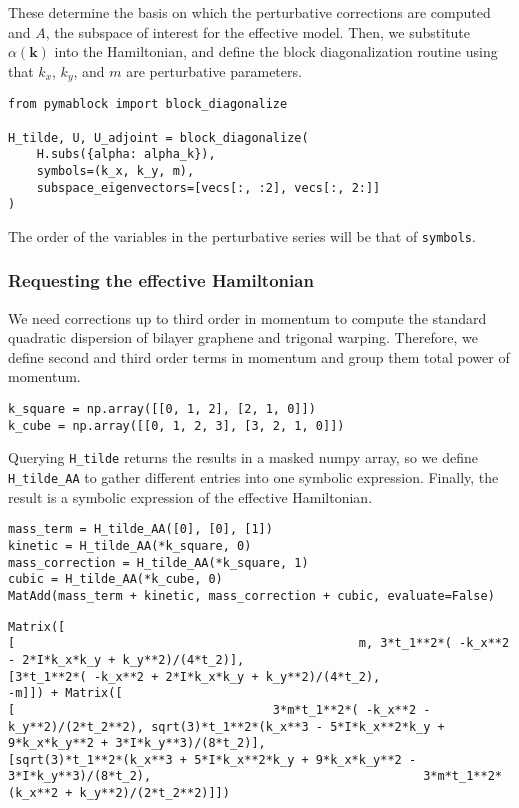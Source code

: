 These determine the basis on which the perturbative corrections are computed
and $A$, the subspace of interest for the effective model.
Then, we substitute $\alpha(\mathbf{k})$ into the Hamiltonian, and define the
block diagonalization routine using that $k_x$, $k_y$, and $m$ are perturbative
parameters.

\begin{verbatim}
from pymablock import block_diagonalize

H_tilde, U, U_adjoint = block_diagonalize(
    H.subs({alpha: alpha_k}),
    symbols=(k_x, k_y, m),
    subspace_eigenvectors=[vecs[:, :2], vecs[:, 2:]]
)
\end{verbatim}

The order of the variables in the perturbative series will be that of \texttt{symbols}.

\subsubsection{Requesting the effective Hamiltonian}

We need corrections up to third order in momentum to compute the standard
quadratic dispersion of bilayer graphene and trigonal warping.
Therefore, we define second and third order terms in momentum and group them
total power of momentum.

\begin{verbatim}
k_square = np.array([[0, 1, 2], [2, 1, 0]])
k_cube = np.array([[0, 1, 2, 3], [3, 2, 1, 0]])
\end{verbatim}

Querying \texttt{H\_tilde} returns the results in a masked numpy array, so we
define \texttt{H\_tilde\_AA} to gather different entries into one symbolic expression.
Finally, the result is a symbolic expression of the effective Hamiltonian.

\begin{verbatim}
mass_term = H_tilde_AA([0], [0], [1])
kinetic = H_tilde_AA(*k_square, 0)
mass_correction = H_tilde_AA(*k_square, 1)
cubic = H_tilde_AA(*k_cube, 0)
MatAdd(mass_term + kinetic, mass_correction + cubic, evaluate=False)
\end{verbatim}

\begin{verbatim}
Matrix([
[                                                m, 3*t_1**2*( -k_x**2 - 2*I*k_x*k_y + k_y**2)/(4*t_2)],
[3*t_1**2*( -k_x**2 + 2*I*k_x*k_y + k_y**2)/(4*t_2),                                                -m]]) + Matrix([
[                                    3*m*t_1**2*( -k_x**2 - k_y**2)/(2*t_2**2), sqrt(3)*t_1**2*(k_x**3 - 5*I*k_x**2*k_y + 9*k_x*k_y**2 + 3*I*k_y**3)/(8*t_2)],
[sqrt(3)*t_1**2*(k_x**3 + 5*I*k_x**2*k_y + 9*k_x*k_y**2 - 3*I*k_y**3)/(8*t_2),                                      3*m*t_1**2*(k_x**2 + k_y**2)/(2*t_2**2)]])
\end{verbatim}

